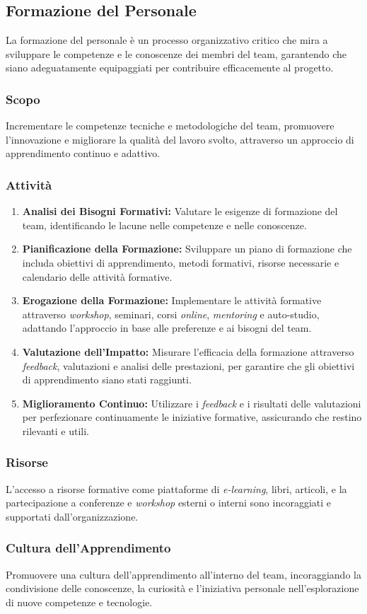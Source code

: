 \subsection{Formazione del Personale}

La formazione del personale è un processo organizzativo critico che mira a
sviluppare le competenze e le conoscenze dei membri del team, garantendo che
siano adeguatamente equipaggiati per contribuire efficacemente al progetto.

\subsubsection{Scopo}
Incrementare le competenze tecniche e metodologiche del team, promuovere
l'innovazione e migliorare la qualità del lavoro svolto, attraverso un approccio
di apprendimento continuo e adattivo.

\subsubsection{Attività}
\begin{enumerate}
	\item \textbf{Analisi dei Bisogni Formativi:} Valutare le esigenze di
	      formazione del team, identificando le lacune nelle competenze e nelle
	      conoscenze.
	\item \textbf{Pianificazione della Formazione:} Sviluppare un piano di
	      formazione che includa obiettivi di apprendimento, metodi formativi,
	      risorse necessarie e calendario delle attività formative.
	\item \textbf{Erogazione della Formazione:} Implementare le attività
	      formative attraverso \textit{workshop}, seminari, corsi
	      \textit{online}, \textit{mentoring} e auto-studio, adattando
	      l'approccio in base alle preferenze e ai bisogni del team.
	\item \textbf{Valutazione dell'Impatto:} Misurare l'efficacia della
	      formazione attraverso \textit{feedback}, valutazioni e analisi delle
	      prestazioni, per garantire che gli obiettivi di apprendimento siano
	      stati raggiunti.
	\item \textbf{Miglioramento Continuo:} Utilizzare i \textit{feedback} e i
	      risultati delle valutazioni per perfezionare continuamente le
	      iniziative formative, assicurando che restino rilevanti e utili.
\end{enumerate}

\subsubsection{Risorse}
L'accesso a risorse formative come piattaforme di \textit{e-learning}, libri,
articoli, e la partecipazione a conferenze e \textit{workshop} esterni o interni
sono incoraggiati e supportati dall'organizzazione.

\subsubsection{Cultura dell'Apprendimento}
Promuovere una cultura dell'apprendimento all'interno del team, incoraggiando
la condivisione delle conoscenze, la curiosità e l'iniziativa personale
nell'esplorazione di nuove competenze e tecnologie.
